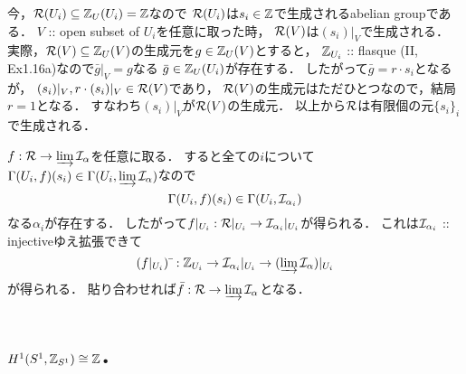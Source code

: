 \documentclass[a4paper]{jsarticle}
\begin{document}
    今，$\mathcal{R}(U_i) \subseteq \mathbb{Z}_U(U_i)=\mathbb{Z}$なので
    $\mathcal{R}(U_i)$は$s_i \in \mathbb{Z}$で生成されるabelian groupである．
    $V$ :: open subset of $U_i$を任意に取った時，
    $\mathcal{R}(V)$は$(s_i)|_V$で生成される．
    実際，$\mathcal{R}(V) \subseteq \mathbb{Z}_U(V)$の生成元を$g \in \mathbb{Z}_U(V)$とすると，
    $\mathbb{Z}_{U_i}$ :: flasque (II, Ex1.16a)なので$\bar{g}|_V=g$なる
    $\bar{g} \in \mathbb{Z}_U(U_i)$が存在する．
    したがって$\bar{g}=r \cdot s_i$となるが，
    $(s_i)|_V, r \cdot (s_i)|_V \in \mathcal{R}(V)$であり，
    $\mathcal{R}(V)$の生成元はただひとつなので，結局$r=1$となる．
    すなわち$(s_i)|_V$が$\mathcal{R}(V)$の生成元．
    以上から$\mathcal{R}$は有限個の元$\{s_i\}_i$で生成される．
    
    $f: \mathcal{R} \to \varinjlim \mathcal{I}_{\alpha}$を任意に取る．
    すると全ての$i$について
    $\Gamma(U_i, f)(s_i) \in \Gamma(U_i, \varinjlim \mathcal{I}_{\alpha})$なので
    \[ \Gamma(U_i, f)(s_i) \in \Gamma(U_i, \mathcal{I}_{\alpha_i}) \]
    なる$\alpha_i$が存在する．
    したがって$f|_{U_i}: \mathcal{R}|_{U_i} \to \mathcal{I}_{\alpha_i}|_{U_i}$が得られる．
    これは$\mathcal{I}_{\alpha_i}$ :: injectiveゆえ拡張できて
    \[ (f|_{U_i})\,\bar{}\,: \mathbb{Z}_{U_i} \to \mathcal{I}_{\alpha_i}|_{U_i} \to (\varinjlim \mathcal{I}_{\alpha})|_{U_i} \]
    が得られる．
    貼り合わせれば$\bar{f}: \mathcal{R} \to \varinjlim \mathcal{I}_{\alpha}$となる．

\section{$H^1(S^1, \mathbb{Z}_{S^1}) \cong \mathbb{Z}$.} %
\end{document}
